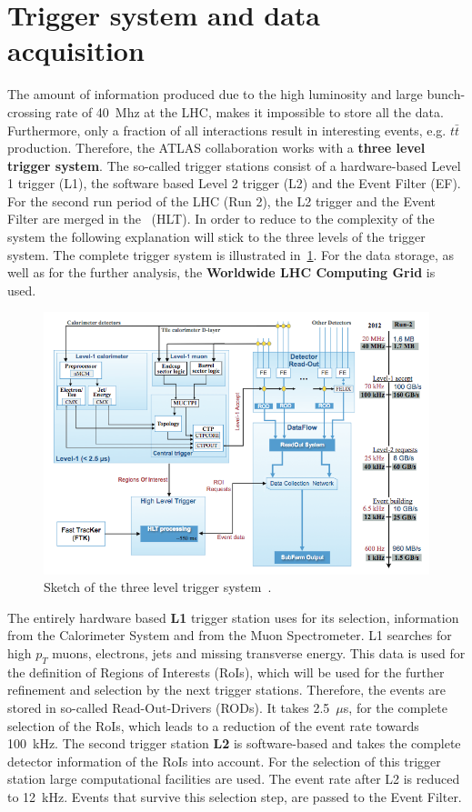 \section{Trigger system and data acquisition}


 The amount of information produced due to the  high luminosity and large bunch-crossing rate of 40~Mhz at the LHC, makes it impossible to store all the data. Furthermore, only a fraction of all interactions result in interesting events, e.g. $t\bar{t}$ production. Therefore, the ATLAS collaboration works with a \textbf{three level trigger system}. The so-called trigger stations consist of a hardware-based Level 1 trigger (L1), the software based Level 2 trigger (L2) and the Event Filter (EF). For the second run period of the LHC (Run 2), the L2 trigger and the Event Filter are merged in  the~ (HLT). In order to reduce to the complexity of the system the following explanation will stick to the three levels of the trigger system. The complete trigger system is illustrated in~\cref{fig:38}. For the data storage, as well as for the further analysis, the \textbf{Worldwide LHC Computing Grid} is used.

\begin{figure}[t]
	\centering
	\includegraphics[width=0.80\linewidth]{trigger}
	\caption{Sketch of the three level trigger system~\cite{Nakahama:2015211}.} 
	\label{fig:38}
\end{figure}


 The entirely hardware based \textbf{L1} trigger station uses for its selection, information from the Calorimeter System and from the Muon Spectrometer. L1 searches for high $p_T$ muons, electrons, jets and missing transverse energy. This data is used for the definition of Regions of Interests (RoIs), which will be used for the further refinement and selection by the next trigger stations. Therefore, the events are stored in so-called Read-Out-Drivers (RODs). It takes 2.5~$\mu$s, for the complete selection of the RoIs, which leads to a reduction of the event rate towards 100~kHz. The second trigger station \textbf{L2} is software-based and takes the complete detector information of the RoIs into account. For the selection of this trigger station large computational facilities are used. The event rate after L2 is reduced to 12~kHz. 
Events that survive this selection step, are passed to the Event Filter.

